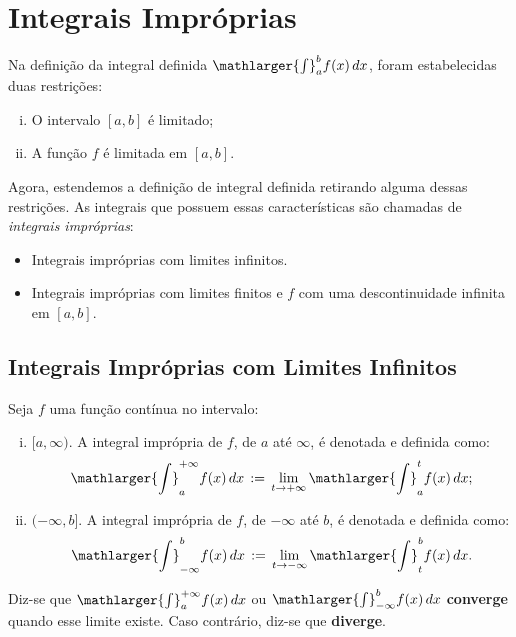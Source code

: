 \cleardoublepage\documentclass[../main.tex]{subfiles}
\begin{document}
\section{Integrais Impróprias}
Na definição da integral definida \(\mathlarger{\int}^{b}_{a} f(x)\,dx\), foram estabelecidas duas restrições:
\begin{enumerate}[i.]
    \item O intervalo \([a,b]\) é limitado;
    \item A função \(f\) é limitada em \([a,b]\).
\end{enumerate}

Agora, estendemos a definição de integral definida retirando alguma dessas restrições. As integrais que possuem essas características são chamadas de \textit{integrais impróprias}:
\begin{itemize}
    \item Integrais impróprias com limites infinitos.
\item Integrais impróprias com limites finitos e \(f\) com uma descontinuidade infinita em \([a,b]\).
\end{itemize}
\subsection{Integrais Impróprias com Limites Infinitos}\hypertarget{LimInf}{}
\begin{framed}
\begin{definition}
Seja \(f\) uma função contínua no intervalo:
\begin{enumerate}[i.]
    \item \([a,\infty)\). A integral imprópria de $f$, de $a$ até  \(\infty\), é denotada e definida como:
\[ \mathlarger{\int}^{+\infty}_{a} f(x)\,dx\,:=\,\lim_{t\to+\infty} \mathlarger{\int}^{t}_{a} f(x)\,dx; \]
\item \((-\infty,b]\). A integral imprópria de \(f\), de \(-\infty\) até \(b\), é denotada e definida como:
\[ \mathlarger{\int}^{b}_{-\infty} f(x)\,dx\,:=\,\lim_{t\to-\infty} \mathlarger{\int}^{b}_{t} f(x)\,dx. \]
\end{enumerate}
Diz-se que \(\mathlarger{\int}^{+\infty}_{a} f(x)\,dx\) ou \(\mathlarger{\int}^{b}_{-\infty} f(x)\,dx\) \textbf{converge} quando esse limite existe. Caso contrário, diz-se que \textbf{diverge}.
\end{definition}
\end{framed}
\end{document}

